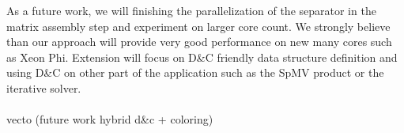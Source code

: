 \documentclass{IOS-Book-Article}
\begin{document}
As a future work, we will finishing the parallelization of the separator in the matrix assembly step and experiment on larger core count.
We strongly believe than our approach will provide very good performance on new many cores such as Xeon Phi.
Extension will focus on D\&C friendly data structure definition and using D\&C on other part of the application such as the SpMV product or the iterative solver. 
\\\\
vecto (future work hybrid d\&c + coloring)



\end{document}
